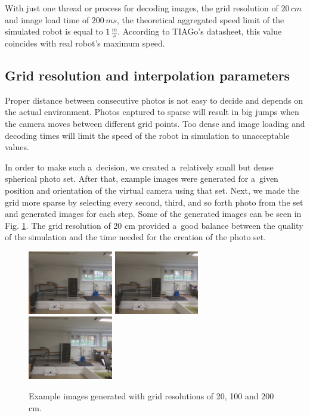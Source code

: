 \documentclass{svproc}
\begin{document}
With just one thread or process for decoding images, the grid resolution of $20\,cm$ and image load time of $200\,ms$, the theoretical aggregated speed limit of the simulated robot is equal to $1\,\frac{m}{s}$.
According to TIAGo's datasheet, this value coincides with real robot's maximum speed.

\subsection{Grid resolution and interpolation parameters}

Proper distance between consecutive photos is not easy to decide and depends on the
actual environment. Photos captured to sparse will result in big jumps when the camera
moves between different grid points. Too dense and image loading and decoding
times will limit the speed of the robot in simulation to unacceptable values.

In order to make such a~decision, we created a~relatively small but dense spherical photo set.
After that, example images were generated for a~given position and orientation of the virtual camera using that set.
Next, we made the grid more sparse by selecting every second, third, and so forth photo from the set and generated images for each step.
Some of the generated images can be seen in Fig. \ref{fig:grid_sizes}.
The grid resolution of 20 cm provided a~good balance between the quality of the simulation and the time needed for the creation of the photo set.

\begin{figure}[!ht]
    \centering
    \includegraphics[width=0.33\textwidth]{img/grid_sizes/10}\hfill%
    \includegraphics[width=0.33\textwidth]{img/grid_sizes/50}\hfill%
    \includegraphics[width=0.33\textwidth]{img/grid_sizes/100}\\
    \caption{Example images generated with grid resolutions of 20, 100 and 200 cm.}
    \label{fig:grid_sizes}
\end{figure}
\end{document}
